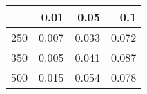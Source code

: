 % 
\begin{tabular}{rrrr}
  \hline
 & 0.01 & 0.05 & 0.1 \\ 
  \hline
250 & 0.007 & 0.033 & 0.072 \\ 
  350 & 0.005 & 0.041 & 0.087 \\ 
  500 & 0.015 & 0.054 & 0.078 \\ 
   \hline
\end{tabular}
